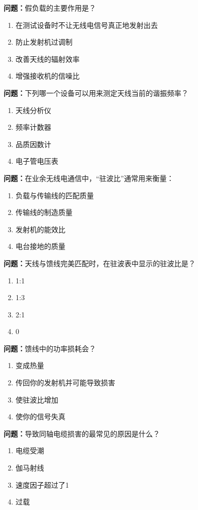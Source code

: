 \documentclass{ctexbook}
\begin{document}
\textbf{问题：}假负载的主要作用是？
\begin{enumerate}[label=\Alph*), leftmargin=3em]
\item 在测试设备时不让无线电信号真正地发射出去
\item 防止发射机过调制
\item 改善天线的辐射效率
\item 增强接收机的信噪比
\end{enumerate}

\textbf{问题：}下列哪一个设备可以用来测定天线当前的谐振频率？
\begin{enumerate}[label=\Alph*), leftmargin=3em]
\item 天线分析仪
\item 频率计数器
\item 品质因数计
\item 电子管电压表
\end{enumerate}

\textbf{问题：}在业余无线电通信中，“驻波比”通常用来衡量：
\begin{enumerate}[label=\Alph*), leftmargin=3em]
\item 负载与传输线的匹配质量
\item 传输线的制造质量
\item 发射机的能效比
\item 电台接地的质量
\end{enumerate}

\textbf{问题：}天线与馈线完美匹配时，在驻波表中显示的驻波比是？
\begin{enumerate}[label=\Alph*), leftmargin=3em]
\item 1:1
\item 1:3
\item 2:1
\item 0
\end{enumerate}

\textbf{问题：}馈线中的功率损耗会？
\begin{enumerate}[label=\Alph*), leftmargin=3em]
\item 变成热量
\item 传回你的发射机并可能导致损害
\item 使驻波比增加
\item 使你的信号失真
\end{enumerate}

\textbf{问题：}导致同轴电缆损害的最常见的原因是什么？
\begin{enumerate}[label=\Alph*), leftmargin=3em]
\item 电缆受潮
\item 伽马射线
\item 速度因子超过了1
\item 过载
\end{enumerate}
\end{document}
